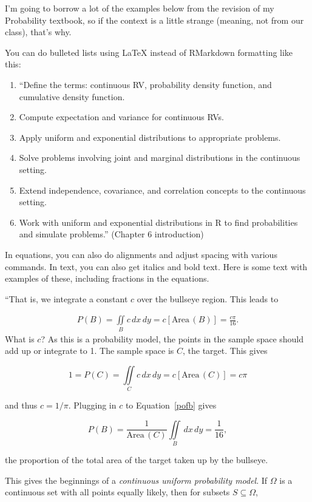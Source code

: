 \documentclass[12pt]{article}
\begin{document}
I'm going to borrow a lot of the examples below from the revision of my
Probability textbook, so if the context is a little strange (meaning,
not from our class), that's why.

You can do bulleted lists using LaTeX instead of RMarkdown formatting
like this:

\begin{enumerate}
\item ``Define the terms: continuous RV, probability density function, and cumulative density function.
\item Compute expectation and variance for continuous RVs.
\item Apply uniform and exponential distributions to appropriate problems.
\item Solve problems involving joint and marginal distributions in the continuous setting.
\item Extend independence, covariance, and correlation concepts to the continuous setting.
\item Work with uniform and exponential distributions in R to find probabilities and simulate problems.'' (Chapter 6 introduction)
\end{enumerate}

In equations, you can also do alignments and adjust spacing with various
commands. In text, you can also get italics and bold text. Here is some
text with examples of these, including fractions in the equations.

``That is, we integrate a constant \(c\) over the bullseye region. This
leads to

\begin{align}
\label{pofb}
P(B) = \iint\limits_B c \, dx \, dy = c \left[  \mbox{Area}\,(B) \right] =  \frac{c \pi}{16}.
\end{align} What is \(c\)? As this is a probability model, the points in
the sample space should add up or integrate to 1. The sample space is
\(C\), the target. This gives

\[ 1 = P(C) = \iint\limits_{C} c \, dx \, dy =  c \left[ \mbox{Area}\,(C) \right] =c \pi\]

and thus \(c = 1/\pi.\) Plugging in \(c\) to Equation~\ref{pofb} gives

\[ P(B) = \frac{1}{\mbox{Area}\,(C)} \iint\limits_B \, dx \, dy = \frac{1}{16},\]

the proportion of the total area of the target taken up by the bullseye.

This gives the beginnings of a
\emph{continuous uniform probability model}. If \(\Omega\) is a
continuous set with all points equally likely, then for subsets
\(S \subseteq \Omega\),
\end{document}
